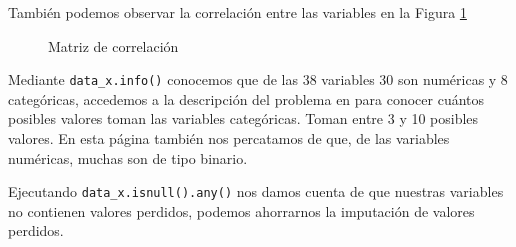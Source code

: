 \documentclass[a4paper, 20pt]{article}
\begin{document}
También podemos observar la correlación entre las variables en la Figura \ref{fig:corr_matrix}


\begin{figure}[H]
  \centering
  
  \caption{Matriz de correlación}
  \label{fig:corr_matrix}
\end{figure}


Mediante \texttt{data\_x.info()} conocemos que de las 38 variables 30 son numéricas y 8 categóricas, accedemos a la descripción del problema en %
para conocer cuántos posibles valores toman las variables categóricas. Toman entre 3 y 10 posibles valores. En esta página también nos percatamos de que, de las variables numéricas, muchas son de tipo binario.

Ejecutando \texttt{data\_x.isnull().any()} nos damos cuenta de que nuestras variables no contienen valores perdidos, podemos ahorrarnos la imputación de valores perdidos.


\printbibliography
\end{document}
